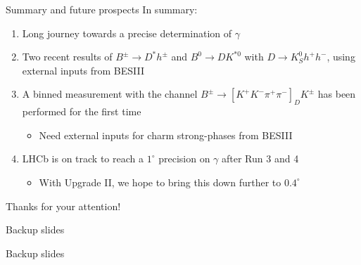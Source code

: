 \documentclass[dvipsnames]{beamer}
\begin{document}
\begin{frame}{Summary and future prospects}
  \vspace{0.0cm}
  {\Large In summary:}
  \vspace{0.3cm}
  \begin{enumerate}
    \setlength\itemsep{1.0em}
    \item{Long journey towards a precise determination of $\gamma$}
    \item{Two recent results of $B^\pm\to D^*h^\pm$ and $B^0\to DK^{*0}$ with $D\to K_S^0h^+h^-$, using external inputs from BESIII}
    \item{A binned measurement with the channel $B^\pm\to[K^+K^-\pi^+\pi^-]_DK^\pm$ has been performed for the first time}
    \begin{itemize}
      \item{Need external inputs for charm strong-phases from BESIII}
    \end{itemize}
    \item{LHCb is on track to reach a $1^\circ$ precision on $\gamma$ after Run 3 and 4}
    \begin{itemize}
      \item{With Upgrade II, we hope to bring this down further to $0.4^\circ$}
    \end{itemize}
  \end{enumerate}
  \vspace{0.4cm}
  \begin{center}
    {\huge Thanks for your attention!}
  \end{center}
\end{frame}

\begin{frame}{Backup slides}
  \begin{center}
    {\huge Backup slides}
  \end{center}
\end{frame}
\end{document}
